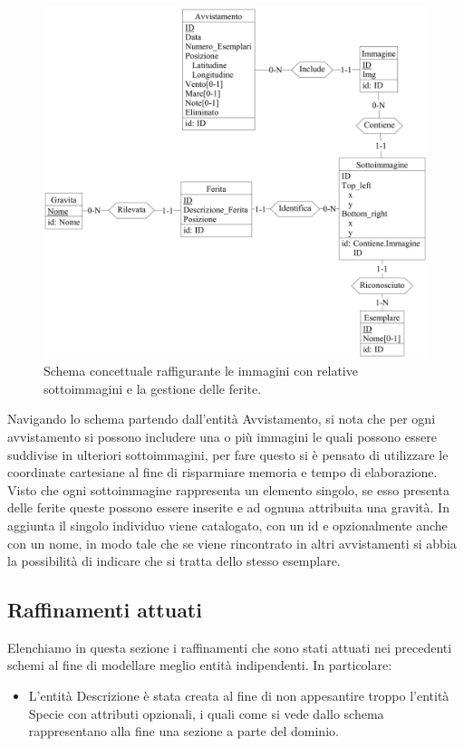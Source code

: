 \documentclass[a4paper,final,12pt]{report}
\begin{document}
\begin{figure}[hbtp]
\centering
\includegraphics[scale=0.12]{img_concettuale/avvistamento3.png}
\caption{Schema concettuale raffigurante le immagini con relative sottoimmagini e la gestione delle ferite.}
\end{figure}

Navigando lo schema partendo dall'entità Avvistamento, si nota che per ogni avvistamento si possono includere una o più immagini le quali possono essere suddivise in ulteriori sottoimmagini, per fare questo si è pensato di utilizzare le coordinate cartesiane al fine di risparmiare memoria e tempo di elaborazione. Visto che ogni sottoimmagine rappresenta un elemento singolo, se esso presenta delle ferite queste possono essere inserite e ad ognuna attribuita una gravità. In aggiunta il singolo individuo viene catalogato, con un id e opzionalmente anche con un nome, in modo tale che se viene rincontrato in altri avvistamenti si abbia la possibilità di indicare che si tratta dello stesso esemplare.

\subsection{Raffinamenti attuati}
Elenchiamo in questa sezione i raffinamenti che sono stati attuati nei precedenti schemi al fine di modellare meglio entità indipendenti. In particolare:
\begin{itemize}
\item L'entità Descrizione è stata creata al fine di non appesantire troppo l'entità Specie con attributi opzionali, i quali come si vede dallo schema rappresentano alla fine una sezione a parte del dominio. 
\end{itemize}
\end{document}
